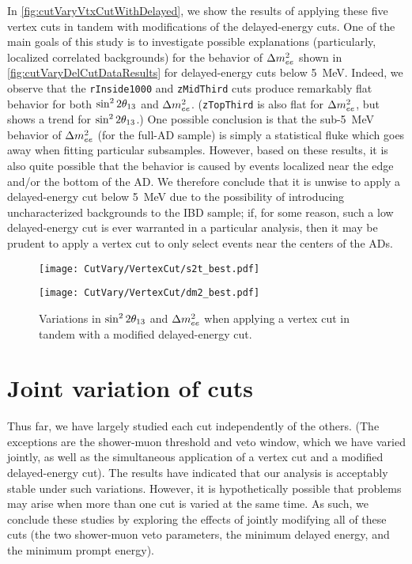 \documentclass[../thesis.tex]{subfiles}
\begin{document}
In \autoref{fig:cutVaryVtxCutWithDelayed}, we show the results of applying these five vertex cuts in tandem with modifications of the delayed-energy cuts. One of the main goals of this study is to investigate possible explanations (particularly, localized correlated backgrounds) for the behavior of $\Delta m^2_{ee}$ shown in \autoref{fig:cutVaryDelCutDataResults} for delayed-energy cuts below 5~MeV. Indeed, we observe that the \texttt{rInside1000} and \texttt{zMidThird} cuts produce remarkably flat behavior for both $\sin^2 2\theta_{13}$ and $\Delta m^2_{ee}$. (\texttt{zTopThird} is also flat for $\Delta m^2_{ee}$, but shows a trend for $\sin^2 2\theta_{13}$.) One possible conclusion is that the sub-5~MeV behavior of $\Delta m^2_{ee}$ (for the full-AD sample) is simply a statistical fluke which goes away when fitting particular subsamples. However, based on these results, it is also quite possible that the behavior is caused by events localized near the edge and/or the bottom of the AD. We therefore conclude that it is unwise to apply a delayed-energy cut below 5~MeV due to the possibility of introducing uncharacterized backgrounds to the IBD sample; if, for some reason, such a low delayed-energy cut is ever warranted in a particular analysis, then it may be prudent to apply a vertex cut to only select events near the centers of the ADs.

\begin{figure}[ht]
  \begin{minipage}{0.47\linewidth}%
    \texttt{[image: CutVary/VertexCut/s2t\_best.pdf]}%
  \end{minipage}%
  \begin{minipage}{0.47\linewidth}%
    \texttt{[image: CutVary/VertexCut/dm2\_best.pdf]}%
  \end{minipage}%
  \caption{Variations in $\sin^2 2\theta_{13}$ and $\Delta m^2_{ee}$ when applying a vertex cut in tandem with a modified delayed-energy cut.}
  \label{fig:cutVaryVtxCutWithDelayed}
\end{figure}

\section{Joint variation of cuts}
\label{sec:cutVaryJoint}

Thus far, we have largely studied each cut independently of the others. (The exceptions are the shower-muon threshold and veto window, which we have varied jointly, as well as the simultaneous application of a vertex cut and a modified delayed-energy cut). The results have indicated that our analysis is acceptably stable under such variations. However, it is hypothetically possible that problems may arise when more than one cut is varied at the same time. As such, we conclude these studies by exploring the effects of jointly modifying all of these cuts (the two shower-muon veto parameters, the minimum delayed energy, and the minimum prompt energy). 
\end{document}
